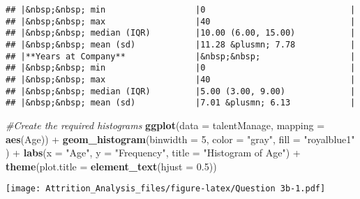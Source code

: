 \documentclass[]{article}
\newenvironment{Shaded}{\begin{snugshade}}{\end{snugshade}}
\newcommand{\KeywordTok}[1]{\textcolor[rgb]{0.13,0.29,0.53}{\textbf{{#1}}}}
\newcommand{\DataTypeTok}[1]{\textcolor[rgb]{0.13,0.29,0.53}{{#1}}}
\newcommand{\DecValTok}[1]{\textcolor[rgb]{0.00,0.00,0.81}{{#1}}}
\newcommand{\FloatTok}[1]{\textcolor[rgb]{0.00,0.00,0.81}{{#1}}}
\newcommand{\StringTok}[1]{\textcolor[rgb]{0.31,0.60,0.02}{{#1}}}
\newcommand{\CommentTok}[1]{\textcolor[rgb]{0.56,0.35,0.01}{\textit{{#1}}}}
\newcommand{\NormalTok}[1]{{#1}}
\begin{document}
\begin{verbatim}
## |&nbsp;&nbsp; min                  |0                             |
## |&nbsp;&nbsp; max                  |40                            |
## |&nbsp;&nbsp; median (IQR)         |10.00 (6.00, 15.00)           |
## |&nbsp;&nbsp; mean (sd)            |11.28 &plusmn; 7.78           |
## |**Years at Company**              |&nbsp;&nbsp;                  |
## |&nbsp;&nbsp; min                  |0                             |
## |&nbsp;&nbsp; max                  |40                            |
## |&nbsp;&nbsp; median (IQR)         |5.00 (3.00, 9.00)             |
## |&nbsp;&nbsp; mean (sd)            |7.01 &plusmn; 6.13            |
\end{verbatim}

\begin{Shaded}
\begin{Highlighting}[]
\CommentTok{#Create the required histograms}
\KeywordTok{ggplot}\NormalTok{(}\DataTypeTok{data =} \NormalTok{talentManage, }\DataTypeTok{mapping =} \KeywordTok{aes}\NormalTok{(Age)) +}
\StringTok{  }\KeywordTok{geom_histogram}\NormalTok{(}\DataTypeTok{binwidth =} \DecValTok{5}\NormalTok{, }\DataTypeTok{color =} \StringTok{"gray"}\NormalTok{, }\DataTypeTok{fill =} \StringTok{"royalblue1"} \NormalTok{) +}
\StringTok{  }\KeywordTok{labs}\NormalTok{(}\DataTypeTok{x =} \StringTok{"Age"}\NormalTok{, }\DataTypeTok{y =} \StringTok{"Frequency"}\NormalTok{, }\DataTypeTok{title =} \StringTok{"Histogram of Age"}\NormalTok{) +}\StringTok{ }
\StringTok{  }\KeywordTok{theme}\NormalTok{(}\DataTypeTok{plot.title =} \KeywordTok{element_text}\NormalTok{(}\DataTypeTok{hjust =} \FloatTok{0.5}\NormalTok{))}
\end{Highlighting}
\end{Shaded}

\texttt{[image: Attrition\_Analysis\_files/figure-latex/Question 3b-1.pdf]}

\begin{Shaded}
\end{Shaded}
\end{document}
